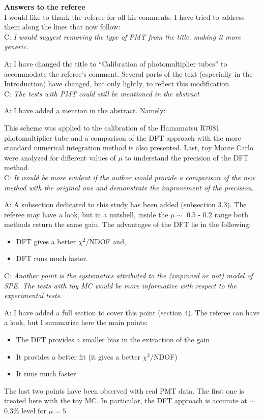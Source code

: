 \documentclass[a4paper,11pt]{article}
\begin{document}
{\bf Answers to the referee}
\\[1ex]

I would like to thank the referee for all his comments. 
I have tried to address them along the lines that now follow:
\\[1ex]

C: \emph{ I would suggest removing the type of PMT from the title, making it more generic. } 
	
A: I have changed the title to ``Calibration of photomultiplier tubes'' %
to accommodate the referee's comment.
Several parts of the text (especially in the Introduction) have changed, but only lightly, to reflect this modification. 
\\[1ex]

C: \emph{The tests with PMT could still be mentioned in the abstract} 

A: I have added a mention in the abstract. Namely: 

This scheme was applied to the calibration of the Hamamatsu R7081 photomultiplier tube and a comparison of the DFT approach with the more standard numerical integration method is also presented.
Last, toy Monte Carlo were analyzed for different values of $\mu$ to understand the precision of the DFT method.
\\[1ex]

C: \emph{ It would be more evident if the author would provide a comparison of the new method with the original one and demonstrate the improvement of the precision. }
	
A: A subsection dedicated to this study has been added (subsection 3.3). 
The referee may have a look, but in a nutshell, inside the $\mu\sim$ 0.5 - 0.2 range both methods return the same gain. 
The advantages of the DFT lie in the following:
\begin{itemize}
\item DFT gives a better $\chi^2$/NDOF and, 
\item DFT runs much faster. 
\end{itemize}

C: \emph{Another point is the systematics attributed to the (improved or not) model of SPE. 
The tests with toy MC would be more informative with respect to the experimental tests.}

A: I have added a full section to cover this point (section 4). The referee can have a look, but I summarize here the main points: 
\begin{itemize}
\item The DFT provides a smaller bias in the extraction of the gain
\item It provides a better fit (it gives a better $\chi^2$/NDOF)
\item It runs much faster 
\end{itemize}
The last two points have been observed with real PMT data. 
The first one is treated here with the toy MC. 
In particular, the DFT approach is accurate at $\sim$ 0.3\% level for $\mu=5$. 
\\[1ex]
\end{document}
